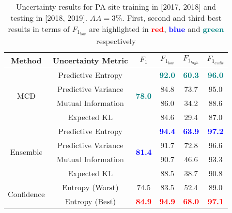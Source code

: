 \begin{table*}[ht!]
\centering
\caption{Uncertainty results for PA site training in [2017, 2018] and testing in [2018, 2019]. $AA=3\%$. First, second and third best results in terms of $F_{1_{low}}$ are highlighted in \textcolor{red}{\textbf{red}}, \textcolor{blue}{\textbf{blue}} and \textcolor{teal}{\textbf{green}} respectively}  
\begin{tabular}{c|c|c|ccc}
\hline
\textbf{Method}             & \textbf{Uncertainty Metric} & \textbf{$F_1$}                    & \textbf{$F_{1_{low}}$} & \textbf{$F_{1_{high}}$} & \textbf{$F_{1_{audit}}$} \\ \hline
\multirow{4}{*}{MCD} & Predictive Entropy          & \multirow{4}{*}{\textcolor{teal}{\textbf{78.0}}}          & \textcolor{teal}{\textbf{92.0}}            & \textcolor{teal}{\textbf{60.3}}             & \textcolor{teal}{\textbf{96.0}}              \\
                            & Predictive Variance         &                                & 84.8            & 73.7             & 95.0              \\
                            & Mutual Information          &                                & 86.0            & 34.2             & 88.6              \\
                            & Expected KL                 &                                & 84.6            & 29.4             & 87.0              \\ \hline
\multirow{4}{*}{Ensemble}   & Predictive Entropy          & \multirow{4}{*}{\textcolor{blue}{\textbf{81.4}}} & \textcolor{blue}{\textbf{94.4}}   & \textcolor{blue}{\textbf{63.9}}    & \textcolor{blue}{\textbf{97.2}}     \\
                            & Predictive Variance         &                                & 91.7            & 72.8             & 96.6              \\
                            & Mutual Information          &                                & 90.7            & 46.6             & 93.3              \\
                            & Expected KL                 &                                & 88.5            & 38.7             & 90.8              \\ \hline
\multirow{2}{*}{Confidence} & Entropy (Worst)             & 74.5                           & 83.5            & 52.4             & 89.0              \\
                            & Entropy (Best)              & \textcolor{red}{\textbf{84.9}}                           & \textcolor{red}{\textbf{94.9}}            & \textcolor{red}{\textbf{68.0}}             & \textcolor{red}{\textbf{97.1}}              \\ \hline
\end{tabular}
\label{tab:PA_results_t0}
\end{table*}


